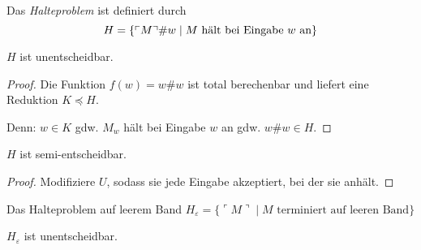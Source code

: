 \begin{Def}[name={[Halteproblem]}]
	Das \emph{Halteproblem} ist definiert durch
	\[H = \{\ulcorner M\urcorner\# w \mid M \text{ hält bei Eingabe } w \text{ an}\} \qedhere\]
\end{Def}
\begin{Satz}[name={[$H$ ist unentscheidbar]}]\label{satz:H ist unentscheidbar}
	$H$ ist unentscheidbar.
\end{Satz}
\begin{proof}
  Die Funktion $f (w) = w\#w$ ist total berechenbar und liefert eine
  Reduktion  $K \preceq H$.

  Denn: $w \in K$ gdw. $M_w$ hält bei Eingabe $w$ an gdw. $w\#w \in H$.
\end{proof}
\begin{Satz}[name={[$H$ ist semi-entscheidbar]}]
	$H$ ist semi-entscheidbar.
\end{Satz}
\begin{proof}
	Modifiziere $U$, sodass sie jede Eingabe akzeptiert, bei der sie anhält.
\end{proof}
\begin{Def}[name={[Halteproblem auf leerem Band $H_\varepsilon$]}]
  Das Halteproblem auf leerem Band $H_\varepsilon = \{\ulcorner M\urcorner \mid M 
	\text{ terminiert auf leeren Band}\}$
\end{Def}
\begin{Satz}[name={[$H_\varepsilon$ ist unentscheidbar]}]
	$H_\varepsilon$ ist unentscheidbar.
\end{Satz}

